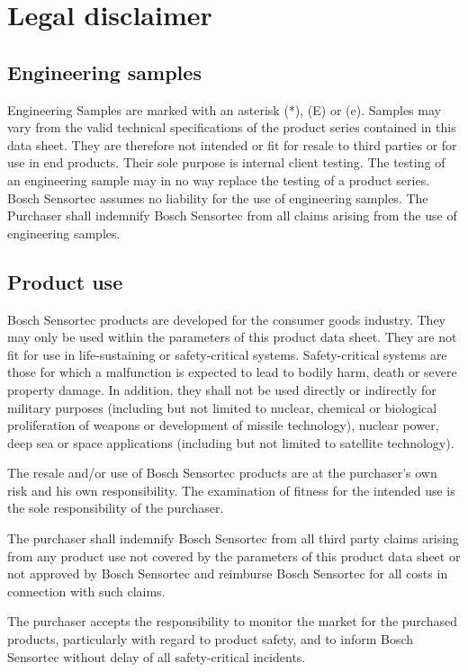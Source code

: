 \section{Legal disclaimer}

\subsection{Engineering samples}

Engineering Samples are marked with an asterisk (*), (E) or (e). Samples may vary from the valid technical specifications of the product series contained in this data sheet. They are therefore not intended or fit for resale to third parties or for use in end products. Their sole purpose is internal client testing. The testing of an engineering sample may in no way replace the testing of a product series. Bosch Sensortec assumes no liability for the use of engineering samples. The Purchaser shall indemnify Bosch Sensortec from all claims arising from the use of engineering samples.

\subsection{Product use}

Bosch Sensortec products are developed for the consumer goods industry. They may only be used within the parameters of this product data sheet. They are not fit for use in life-sustaining or safety-critical systems. Safety-critical systems are those for which a malfunction is expected to lead to bodily harm, death or severe property damage. In addition, they shall not be used directly or indirectly for military purposes (including but not limited to nuclear, chemical or biological proliferation of weapons or development of missile technology), nuclear power, deep sea or space applications (including but not limited to satellite technology).

The resale and/or use of Bosch Sensortec products are at the purchaser’s own risk and his own responsibility. The examination of fitness for the intended use is the sole responsibility of the purchaser. 

The purchaser shall indemnify Bosch Sensortec from all third party claims arising from any product use not covered by the parameters of this product data sheet or not approved by Bosch Sensortec and reimburse Bosch Sensortec for all costs in connection with such claims.

The purchaser accepts the responsibility to monitor the market for the purchased products, particularly with regard to product safety, and to inform Bosch Sensortec without delay of all safety-critical incidents.

